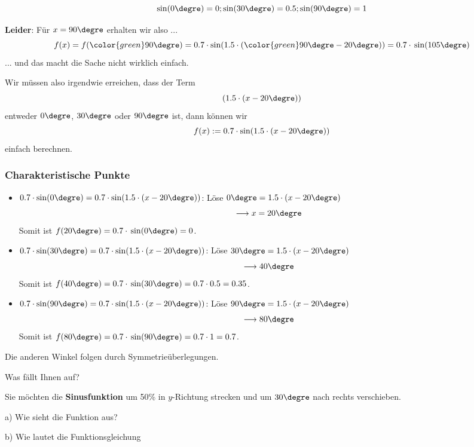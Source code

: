 $$\sin(0\degre)  = 0  ; \sin(30\degre) = 0.5; \sin(90\degre) = 1  $$

\textbf{Leider}: Für $x=90\degre$ \zB erhalten wir also ... $$f(x) = f({\color{green}90\degre}) = 0.7\cdot\sin(1.5\cdot({\color{green}90\degre}-20\degre)) = 0.7\cdot{}\sin(105\degre)$$ ... und das macht die Sache nicht wirklich einfach.


Wir müssen also irgendwie erreichen, dass der Term $$(1.5\cdot(x-20\degre))$$
entweder $0\degre$, $30\degre$ oder $90\degre$ ist, dann können
wir $$f(x) := 0.7\cdot\sin(1.5\cdot(x-20\degre))$$ einfach berechnen.


\newpage
\subsubsection{Charakteristische Punkte}



\begin{itemize}
\item  $0.7\cdot\sin(0\degre) = 0.7\cdot\sin(1.5\cdot(x-20\degre))$:
  Löse $0\degre = 1.5\cdot(x-20\degre)$
  $$\longrightarrow x=20\degre$$
  Somit ist $f(20\degre) = 0.7\cdot{}\sin(0\degre) = 0$.
\item  $0.7\cdot\sin(30\degre) = 0.7\cdot\sin(1.5\cdot(x-20\degre))$:
  Löse $30\degre = 1.5\cdot(x-20\degre)$
  $$\longrightarrow 40\degre$$
  Somit ist $f(40\degre) = 0.7\cdot{}\sin(30\degre) = 0.7\cdot{}0.5 = 0.35$.
\item  $0.7\cdot\sin(90\degre) = 0.7\cdot\sin(1.5\cdot(x-20\degre))$:
  Löse $90\degre = 1.5\cdot(x-20\degre)$
  $$\longrightarrow 80\degre$$
  Somit ist $f(80\degre) = 0.7\cdot{}\sin(90\degre) = 0.7\cdot{}1 = 0.7$.
\end{itemize}
Die anderen Winkel folgen durch Symmetrieüberlegungen.



\newpage
Was fällt Ihnen auf?
\newpage

Sie möchten die \textbf{Sinusfunktion} um 50\% in $y$-Richtung strecken und um
$30\degre$ nach rechts verschieben.

a) Wie sieht die Funktion aus?

\trigsysC{}


b) Wie lautet die Funktionsgleichung

